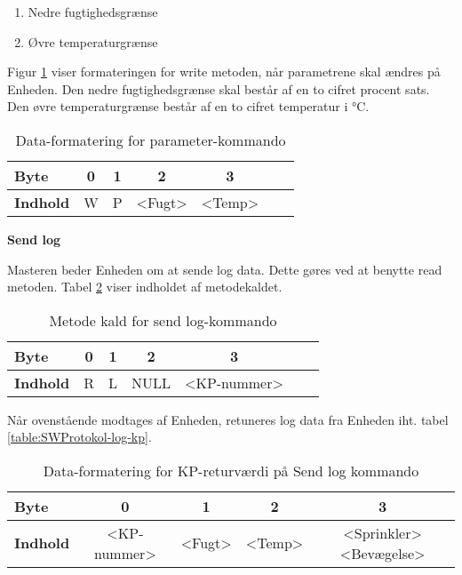 \begin{enumerate}
	\item Nedre fugtighedsgrænse
	\item Øvre temperaturgrænse
\end{enumerate}

Figur \ref{table:SWProtokol-para} viser formateringen for write metoden, når parametrene skal ændres på Enheden. Den nedre fugtighedsgrænse skal består af en to cifret procent sats. Den øvre temperaturgrænse består af en to cifret temperatur i °C.

\begin{table}[H]
	\caption{Data-formatering for parameter-kommando}
	\centering
	\begin{tabular}{|l|c|c|c|c|c|c|}
		\hline 
		\textbf{Byte} & 0 & 1 & 2 & 3 \\ 
		\hline 
		\textbf{Indhold} & W & P & <Fugt> & <Temp> \\ 
		\hline 
	\end{tabular} 
	\label{table:SWProtokol-para}
\end{table}


\textbf{Send log}

Masteren beder Enheden om at sende log data. Dette gøres ved at benytte read metoden. Tabel \ref{table:SWProtokol-log} viser indholdet af metodekaldet. 

\begin{table}[H]
	\caption{Metode kald for send log-kommando}
	\centering
	\begin{tabular}{|l|c|c|c|c|c|c|}
		\hline 
		\textbf{Byte} & 0 & 1 & 2 & 3 \\ 
		\hline 
		\textbf{Indhold} & R & L & NULL & <KP-nummer> \\ 
		\hline 
	\end{tabular} 
	\label{table:SWProtokol-log}
\end{table}

Når ovenstående modtages af Enheden, retuneres log data fra Enheden iht. tabel \ref{table:SWProtokol-log-kp}. 

\begin{table}[H]
	\caption{Data-formatering for KP-returværdi på Send log kommando}
	\centering
	\begin{tabular}{|l|c|c|c|c|}
		\hline 
		\textbf{Byte} & 0 & 1 & 2 & 3 \\ 
		\hline 
		\textbf{Indhold} & <KP-nummer> & <Fugt> & <Temp> & <Sprinkler><Bevægelse> \\ 
		\hline 
	\end{tabular} 
	\label{table:SWProtokol-log-retur}
\end{table}
